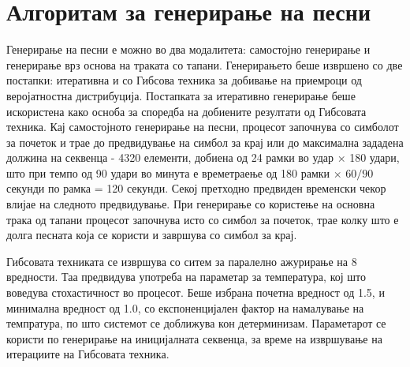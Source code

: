 \section{Алгоритам за генерирање на песни}

Генерирање на песни е можно во два модалитета: самостојно генерирање и генерирање врз основа на траката со тапани. Генерирањето беше извршено со две постапки: итеративна и со Гибсова техника за добивање на приемроци од веројатностна дистрибуција. Постапката за итеративно генерирање беше искористена како осноба за споредба на добиените резултати од Гибсовата техника. Кај самостојното генерирање на песни, процесот започнува со симболот за почеток и трае до предвидување на симбол за крај или до максимална зададена должина на секвенца - 4320 елементи, добиена од 24 рамки во удар × 180 удари, што при темпо од 90 удари во минута е времетраење од 180 рамки × $60/90$ секунди по рамка = 120 секунди. Секој претходно предвиден временски чекор влијае на следното предвидување. При генерирање со користење на основна трака од тапани процесот започнува исто со симбол за почеток, трае колку што е долга песната која се користи и завршува со симбол за крај.

Гибсовата техниката се извршува со ситем за паралелно ажурирање на 8 вредности. Таа предвидува употреба на параметар за температура, кој што воведува стохастичност во процесот. Беше избрана почетна вредност од 1.5, и минимална вредност од 1.0, со експоненцијален фактор на намалување на темпратура, по што системот се доближува кон детерминизам. Параметарот се користи по генерирање на иницијалната секвенца, за време на извршување на итерациите на Гибсовата техника.


